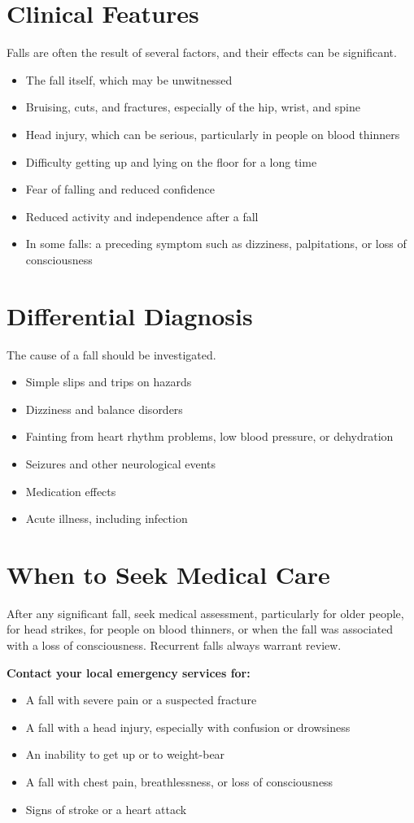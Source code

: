 \section*{Clinical Features}
Falls are often the result of several factors, and their effects can be significant.
\begin{itemize}
    \item The fall itself, which may be unwitnessed
    \item Bruising, cuts, and fractures, especially of the hip, wrist, and spine
    \item Head injury, which can be serious, particularly in people on blood thinners
    \item Difficulty getting up and lying on the floor for a long time
    \item Fear of falling and reduced confidence
    \item Reduced activity and independence after a fall
    \item In some falls: a preceding symptom such as dizziness, palpitations, or loss of consciousness
\end{itemize}

\section*{Differential Diagnosis}
The cause of a fall should be investigated.
\begin{itemize}
    \item Simple slips and trips on hazards
    \item Dizziness and balance disorders
    \item Fainting from heart rhythm problems, low blood pressure, or dehydration
    \item Seizures and other neurological events
    \item Medication effects
    \item Acute illness, including infection
\end{itemize}

\section*{When to Seek Medical Care}
After any significant fall, seek medical assessment, particularly for older people, for head strikes, for people on blood thinners, or when the fall was associated with a loss of consciousness. Recurrent falls always warrant review.

\textbf{Contact your local emergency services for:}
\begin{itemize}
    \item A fall with severe pain or a suspected fracture
    \item A fall with a head injury, especially with confusion or drowsiness
    \item An inability to get up or to weight-bear
    \item A fall with chest pain, breathlessness, or loss of consciousness
    \item Signs of stroke or a heart attack
\end{itemize}

